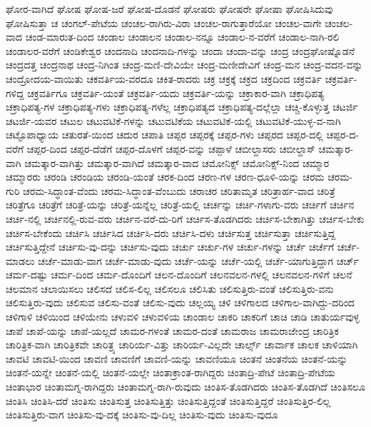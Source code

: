 {ಘೋರ-ವಾಗಿದೆ
ಘೋಷ
ಘೋಷ-ಜರೆ
ಘೋಷ-ದೊಡನೆ
ಘೋಷರು
ಘೋಷರೇ
ಘೋಷಾ
ಘೋಷಿಸಿದುವು
ಘೋಷಿಸುತ್ತಾ
ಚ
ಚಂಗಲ್-ಪೇಟೆಯ
ಚಂಚಲ-ರಾಗಿರು-ವಿರಾ
ಚಂಚಲ-ರಾಗುತ್ತಾರೆಯೋ
ಚಂಚಲ-ವಾಗೇ
ಚಂಚಲ-ವಾದ
ಚಂಡ-ಮಾರುತ-ದಿಂದ
ಚಂಡಾಲ
ಚಂಡಾಲನ
ಚಂಡಾಲ-ನನ್ನೂ
ಚಂಡಾಲ-ನ-ವರೆಗೆ
ಚಂಡಾಲ-ನಾಗಿ-ರಲಿ
ಚಂಡಾಲರ-ವರೆಗೆ
ಚಂಡಿಕೇಶ್ವರ
ಚಂದನಾದಿ
ಚಂದನಾದಿ-ಗಳನ್ನು
ಚಂದಾ
ಚಂದಾ-ವನ್ನು
ಚಂದ್ರ
ಚಂದ್ರಘೋಷ್ನೊಡನೆ
ಚಂದ್ರದತ್ತ
ಚಂದ್ರನಾಥ
ಚಂದ್ರ-ನಿಗಿಂತ
ಚಂದ್ರ-ಮಣಿ-ದೇವಿಯೇ
ಚಂದ್ರ-ಮಣೀದೇವಿಗೆ
ಚಂದ್ರ-ಮನ
ಚಂದ್ರ-ವದನ-ವನ್ನು
ಚಂದ್ರೋದಯ-ವಾಯಿತು
ಚಕವರ್ತಿಯ-ವರದೂ
ಚಕಿತ-ರಾದರು
ಚಕ್ರ
ಚಕ್ರಕ್ಕೆ
ಚಕ್ರದ
ಚಕ್ರದಿಂದ
ಚಕ್ರವರ್ತಿ
ಚಕ್ರವರ್ತಿ-ಗಳಿದ್ದ
ಚಕ್ರವರ್ತಿಗೂ
ಚಕ್ರವರ್ತಿ-ಯಂತೆ
ಚಕ್ರವರ್ತಿ-ಯದು
ಚಕ್ರವರ್ತಿ-ಯನ್ನು
ಚಕ್ರಾಕಾರ-ವಾಗಿ
ಚಕ್ರಾಧಿಪತ್ಯ
ಚಕ್ರಾಧಿಪತ್ಯ-ಗಳ
ಚಕ್ರಾಧಿಪತ್ಯ-ಗಳು
ಚಕ್ರಾಧಿಪತ್ಯ-ಗಳೆಲ್ಲ
ಚಕ್ರಾಧಿಪತ್ಯದ
ಚಕ್ರಾಧಿಪತ್ಯ-ದಲ್ಲೆಲ್ಲಾ
ಚಚ್ಚಿ-ಕೊಳ್ಳುತ್ತ
ಚಟರ್ಜಿ
ಚಟರ್ಜಿ-ಯವರ
ಚಟುಲ
ಚಟುವಟಿಕೆ-ಗಳನ್ನು
ಚಟುವಟಿಕೆಯ
ಚಟುವಟಿಕೆ-ಯಲ್ಲಿ
ಚಟುವಟಿಕೆ-ಯುಳ್ಳ-ವ-ನಾಗಿ
ಚಟ್ಟೊಪಾಧ್ಯಾಯ
ಚತುರತೆ-ಯಿಂದ
ಚದುರ
ಚಪಾತಿ
ಚಪ್ಪರ
ಚಪ್ಪರಕ್ಕೆ
ಚಪ್ಪರ-ಗಳು
ಚಪ್ಪರದ
ಚಪ್ಪರ-ದಲ್ಲಿ
ಚಪ್ಪರ-ದ-ವರೆಗೆ
ಚಪ್ಪರ-ದಿಂದ
ಚಪ್ಪರ-ದೆಡೆಗೆ
ಚಪ್ಪರ-ದೊಳಗೆ
ಚಪ್ಪರ-ವನ್ನು
ಚಪ್ಪಾಳೆ
ಚಬೀಲ್ದಾಸರು
ಚಬೀಲ್ದಾಸ್
ಚಮತ್ಕಾರ-ವಾಗಿ
ಚಮತ್ಕಾರ-ವಾಗಿತ್ತು
ಚಮತ್ಕಾರ-ವಾಗಿದೆ
ಚಮತ್ಕಾರ-ವಾದ
ಚಮೋನಿಕ್ಸ್
ಚಮೋನಿಕ್ಸ್-ನಿಂದ
ಚಮ್ಮಾರ
ಚಮ್ಮಾರರು
ಚರಂಡಿ
ಚರಂಡಿಯ
ಚರಂಡಿ-ಯಂತೆ
ಚರಕ-ದಿಂದ
ಚರಣ-ಗಳ
ಚರಣ-ಧೂಳಿ-ಯನ್ನು
ಚರಮ
ಚರಮ-ಗುರಿ
ಚರಮ-ಸಿದ್ಧಾಂತ-ವೆಂದು
ಚರಮ-ಸಿದ್ಧಾಂತ-ವೆಂಬುದು
ಚರಾಚರ
ಚರಿತಾಮೃತ
ಚರಿತ್ರಾರ್ಹ-ವಾದ
ಚರಿತ್ರೆ
ಚರಿತ್ರೆಗೂ
ಚರಿತ್ರೆಗೆ
ಚರಿತ್ರೆ-ಯನ್ನು
ಚರಿತ್ರೆ-ಯನ್ನೆಲ್ಲ
ಚರಿತ್ರೆ-ಯಲ್ಲಿ
ಚರ್ಚನ್ನು
ಚರ್ಚಿ-ಗಳಾಗು-ವರು
ಚರ್ಚಿಗೆ
ಚರ್ಚಿನ
ಚರ್ಚಿ-ನಲ್ಲಿ
ಚರ್ಚಿನಲ್ಲಿ-ರುವ-ವರು
ಚರ್ಚಿನ-ವರೆ-ದು-ರಿಗೆ
ಚರ್ಚಿಸ-ತೊಡಗಿದರು
ಚರ್ಚಿಸ-ಬೇಕಾಗಿತ್ತು
ಚರ್ಚಿಸ-ಬೇಕು
ಚರ್ಚಿಸ-ಬೇಕೆಂದು
ಚರ್ಚಿಸಿ
ಚರ್ಚಿಸಿದ
ಚರ್ಚಿಸಿ-ದರು
ಚರ್ಚಿಸಿ-ದಳು
ಚರ್ಚಿಸುತ್ತ
ಚರ್ಚಿಸುತ್ತಾ
ಚರ್ಚಿಸುತ್ತಿದ್ದ
ಚರ್ಚಿಸುತ್ತಿದ್ದೇನೆ
ಚರ್ಚಿಸು-ವು-ದನ್ನು
ಚರ್ಚಿಸು-ವುದು
ಚರ್ಚು
ಚರ್ಚು-ಗಳ
ಚರ್ಚು-ಗಳನ್ನು
ಚರ್ಚೆ
ಚರ್ಚೆಗೆ
ಚರ್ಚೆ-ಮಾಡಲು
ಚರ್ಚೆ-ಮಾಡು-ವಾಗ
ಚರ್ಚೆ-ಮಾಡು-ವುದು
ಚರ್ಚೆ-ಯನ್ನು
ಚರ್ಚೆ-ಯಲ್ಲಿ
ಚರ್ಚೆ-ಯಾಗುತ್ತಿದ್ದಾಗ
ಚರ್ಚ್
ಚರ್ಮ-ದಷ್ಟು
ಚರ್ಮ-ದಿಂದ
ಚರ್ಮ-ದೊಂದಿಗೆ
ಚಲನ-ದೊಂದಿಗೆ
ಚಲನವಲನ-ಗಳಲ್ಲಿ
ಚಲನವಲನ-ಗಳಿಗೆ
ಚಲನೆ
ಚಲಮಾನ
ಚಲಾಯಿಸಲು
ಚಲಿಸದೆ
ಚಲಿಸ-ಲಿಲ್ಲ
ಚಲಿಸಲೂ
ಚಲಿಸಿತು
ಚಲಿಸುತ್ತಿರು-ವಂತೆ
ಚಲಿಸುತ್ತಿರು-ವನು
ಚಲಿಸುತ್ತಿರು-ವುದು
ಚಲಿಸುವ
ಚಲಿಸು-ವಂತೆ
ಚಲಿಸು-ವುದು
ಚಲ್ಲಯ್ಯ
ಚಳಿ
ಚಳಿಗಾಲದ
ಚಳಿಗಾಲ-ವಾಗಿದ್ದು-ದರಿಂದ
ಚಳಿಗಾಳಿ
ಚಳಿಯಿಂದ
ಚಳಿಯೇನು
ಚಳುವಳಿ
ಚಳುವಳಿಯ
ಚಾಂಡಾಲ
ಚಾಕರಿ
ಚಾಕರಿಗೆ
ಚಾಚಿ
ಚಾಡಿ
ಚಾತುರ್ಯವುಳ್ಳ
ಚಾಪೆ
ಚಾಪೆ-ಯನ್ನು
ಚಾಪೆ-ಯಲ್ಲದೆ
ಚಾಮರ-ಗಳಂತೆ
ಚಾಮರ-ದಂತೆ
ಚಾಮರಾಜ
ಚಾಮರಾಜೇಂದ್ರ
ಚಾರಿತ್ರಿಕ
ಚಾರಿತ್ರಿಕ-ವಾಗಿ
ಚಾರಿತ್ರಿಕವೇ
ಚಾರಿತ್ರ್ಯ
ಚಾರಿರ್ಯ-ವಿತ್ತು
ಚಾರಿರ್ಯ-ವಿಲ್ಲದೇ
ಚಾರ್ಲ್ಸ್
ಚಾರ್ವಾಕ
ಚಾಲಕ
ಚಾಳಿಯಾಗಿ
ಚಾವಟಿ
ಚಾವಟಿ-ಯಿಂದ
ಚಾವಣಿ
ಚಾವಣಿಗೆ
ಚಾವಣಿ-ಯನ್ನು
ಚಾವಣಿಯೂ
ಚಿಂತನೆ
ಚಿಂತನೆಯ
ಚಿಂತನೆ-ಯನ್ನು
ಚಿಂತನೆ-ಯನ್ನೇ
ಚಿಂತನೆ-ಯಲ್ಲಿ
ಚಿಂತನೆ-ಯಲ್ಲೇ
ಚಿಂತಾಕ್ರಾಂತ-ರಾಗಿದ್ದರು
ಚಿಂತಾದ್ರಿ-ಪೇಟೆ
ಚಿಂತಾದ್ರಿ-ಪೇಟೆಯ
ಚಿಂತಾಭಾರ
ಚಿಂತಾಮಗ್ನ-ರಾಗಿದ್ದರು
ಚಿಂತಾಮಗ್ನ-ರಾಗಿ-ರುವುದು
ಚಿಂತಿಸ-ತೊಡಗಿದರು
ಚಿಂತಿಸ-ತೊಡಗಿದೆ
ಚಿಂತಿಸಲೂ
ಚಿಂತಿಸಿ
ಚಿಂತಿಸಿ-ದರೆ
ಚಿಂತಿಸು
ಚಿಂತಿಸುತ್ತ
ಚಿಂತಿಸುತ್ತಿತ್ತು
ಚಿಂತಿಸುತ್ತಿದ್ದಂತೆ
ಚಿಂತಿಸುತ್ತಿದ್ದರೆ
ಚಿಂತಿಸುತ್ತಿರ-ಲಿಲ್ಲ
ಚಿಂತಿಸುತ್ತಿರು-ವಾಗ
ಚಿಂತಿಸು-ವು-ದಕ್ಕೆ
ಚಿಂತಿಸು-ವು-ದಿಲ್ಲ
ಚಿಂತಿಸು-ವುದು
ಚಿಂತಿಸು-ವುದೂ
}
